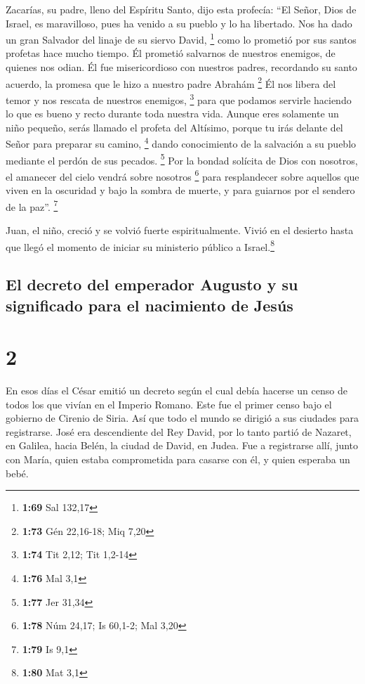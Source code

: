  Zacarías, su padre, lleno del Espíritu Santo, dijo esta
profecía:  ``El Señor, Dios de Israel, es maravilloso,
pues ha venido a su pueblo y lo ha libertado.  Nos ha
dado un gran Salvador del linaje de su siervo David, \footnote{\textbf{1:69}
  Sal 132,17}  como lo prometió por sus santos profetas
hace mucho tiempo.  Él prometió salvarnos de nuestros
enemigos, de quienes nos odian.  Él fue misericordioso
con nuestros padres, recordando su santo acuerdo,  la
promesa que le hizo a nuestro padre Abrahám \footnote{\textbf{1:73} Gén
  22,16-18; Miq 7,20}  Él nos libera del temor y nos
rescata de nuestros enemigos, \footnote{\textbf{1:74} Tit 2,12; Tit
  1,2-14}  para que podamos servirle haciendo lo que es
bueno y recto durante toda nuestra vida.  Aunque eres
solamente un niño pequeño, serás llamado el profeta del Altísimo, porque
tu irás delante del Señor para preparar su camino, \footnote{\textbf{1:76}
  Mal 3,1}  dando conocimiento de la salvación a su
pueblo mediante el perdón de sus pecados. \footnote{\textbf{1:77} Jer
  31,34}  Por la bondad solícita de Dios con nosotros, el
amanecer del cielo vendrá sobre nosotros \footnote{\textbf{1:78} Núm
  24,17; Is 60,1-2; Mal 3,20}  para resplandecer sobre
aquellos que viven en la oscuridad y bajo la sombra de muerte, y para
guiarnos por el sendero de la paz''. \footnote{\textbf{1:79} Is 9,1}

 Juan, el niño, creció y se volvió fuerte
espiritualmente. Vivió en el desierto hasta que llegó el momento de
iniciar su ministerio público a Israel.\footnote{\textbf{1:80} Mat 3,1}

\hypertarget{el-decreto-del-emperador-augusto-y-su-significado-para-el-nacimiento-de-jesuxfas}{%
\subsection{El decreto del emperador Augusto y su significado para el
nacimiento de
Jesús}\label{el-decreto-del-emperador-augusto-y-su-significado-para-el-nacimiento-de-jesuxfas}}

\hypertarget{section-1}{%
\section{2}\label{section-1}}

 En esos días el César emitió un decreto según el cual
debía hacerse un censo de todos los que vivían en el Imperio Romano.
 Este fue el primer censo bajo el gobierno de Cirenio de
Siria.  Así que todo el mundo se dirigió a sus ciudades
para registrarse.  José era descendiente del Rey David,
por lo tanto partió de Nazaret, en Galilea, hacia Belén, la ciudad de
David, en Judea.  Fue a registrarse allí, junto con María,
quien estaba comprometida para casarse con él, y quien esperaba un bebé.

